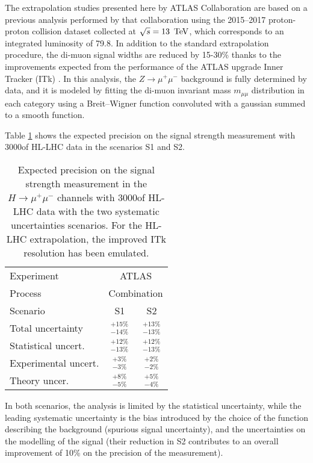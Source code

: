 The extrapolation studies presented here by ATLAS Collaboration are based on a previous analysis performed by that collaboration using the 2015--2017 proton-proton collision dataset collected at $\sqrt{s} = 13\,~\text{TeV}$, which corresponds to an integrated luminosity of 79.8\fbinv \cite{Aaboud:2017ojs}. 
In addition to the standard extrapolation procedure, the di-muon signal widths are reduced  by 15-30\% thanks to the improvements expected from the performance of the ATLAS upgrade Inner Tracker (ITk) \cite{Collaboration:2285585}.
In this analysis, the $Z\to\mu^{+}\mu^{-}$ background is fully determined by data, and it is modeled by fitting the di-muon invariant mass $m_{\mu\mu}$ distribution in each category using a Breit--Wigner function convoluted with a gaussian summed to a smooth function.

Table \ref{tab:hmumu_proj} shows the expected precision on the signal strength measurement with 3000\fbinv of HL-LHC data in the scenarios S1 and S2.
 \begin{table}[th!]
\begin{center}
\renewcommand{\arraystretch}{1.5}
{
\caption{Expected precision on the signal strength measurement in the $H\to\mu^{+}\mu^{-}$ channels with 3000\fbinv of HL-LHC data with the two systematic uncertainties scenarios. For the HL-LHC extrapolation, the improved ITk resolution has been emulated. }
\label{tab:hmumu_proj}
\begin{tabular}{l | c c}
\hline\hline
Experiment & \multicolumn{2}{c}{ATLAS}\\
Process & \multicolumn{2}{c}{Combination}\\ 
\hline
Scenario  & S1 & S2  \\
Total uncertainty   & $^{+15\%}_{-14\%}$  & $^{+13\%}_{-13\%}$  \\
\hline
Statistical uncert. & $^{+12\%}_{-13\%}$  & $^{+12\%}_{-13\%}$  \\
Experimental uncert. & $^{+3\%}_{-3\%}$  & $^{+2\%}_{-2\%}$  \\
Theory uncer. & $^{+8\%}_{-5\%}$ & $^{+5\%}_{-4\%}$  \\
\hline\hline
\end{tabular}
} %
\end{center}
\end{table}
In both scenarios, the analysis is limited by the statistical uncertainty, while the leading systematic uncertainty is the bias introduced by the choice of the function describing the background (spurious signal uncertainty), and the uncertainties on the modelling of the signal (their reduction in S2 contributes to an overall improvement of 10\% on the precision of the measurement).

